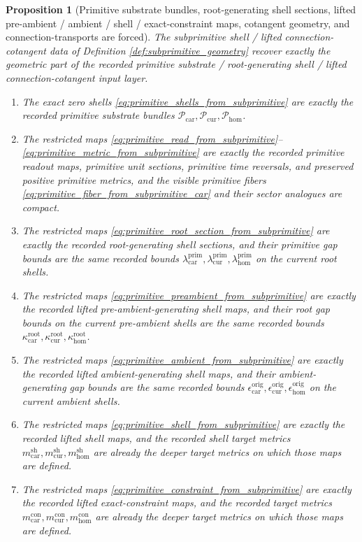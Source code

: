 \documentclass[11pt]{article}
\newcommand{\TensorShellMetric}{m_{\mathrm{car}}^{\mathrm{sh}}}
\newcommand{\CurShellMetric}{m_{\mathrm{cur}}^{\mathrm{sh}}}
\newcommand{\HomShellMetric}{m_{\mathrm{hom}}^{\mathrm{sh}}}
\newcommand{\TensorConstraintMetric}{m_{\mathrm{car}}^{\mathrm{con}}}
\newcommand{\CurConstraintMetric}{m_{\mathrm{cur}}^{\mathrm{con}}}
\newcommand{\HomConstraintMetric}{m_{\mathrm{hom}}^{\mathrm{con}}}
\newcommand{\TensorOriginGap}{\epsilon_{\mathrm{car}}^{\mathrm{orig}}}
\newcommand{\CurOriginGap}{\epsilon_{\mathrm{cur}}^{\mathrm{orig}}}
\newcommand{\HomOriginGap}{\epsilon_{\mathrm{hom}}^{\mathrm{orig}}}
\newcommand{\TensorRootGap}{\kappa_{\mathrm{car}}^{\mathrm{root}}}
\newcommand{\CurRootGap}{\kappa_{\mathrm{cur}}^{\mathrm{root}}}
\newcommand{\HomRootGap}{\kappa_{\mathrm{hom}}^{\mathrm{root}}}
\newcommand{\TensorPrimitiveSpace}{\mathcal P_{\mathrm{car}}}
\newcommand{\CurPrimitiveSpace}{\mathcal P_{\mathrm{cur}}}
\newcommand{\HomPrimitiveSpace}{\mathcal P_{\mathrm{hom}}}
\newcommand{\TensorPrimitiveGap}{\lambda_{\mathrm{car}}^{\mathrm{prim}}}
\newcommand{\CurPrimitiveGap}{\lambda_{\mathrm{cur}}^{\mathrm{prim}}}
\newcommand{\HomPrimitiveGap}{\lambda_{\mathrm{hom}}^{\mathrm{prim}}}
\newtheorem{proposition}{Proposition}
\begin{document}
\begin{proposition}[Primitive substrate bundles, root-generating shell sections, lifted pre-ambient / ambient / shell / exact-constraint maps, cotangent geometry, and connection-transports are forced]
\label{prop:primitive_geometry_forced}
The subprimitive shell / lifted connection-cotangent data of Definition \ref{def:subprimitive_geometry} recover exactly the geometric part of the recorded primitive substrate / root-generating shell / lifted connection-cotangent input layer.
\begin{enumerate}
    \item The exact zero shells \eqref{eq:primitive_shells_from_subprimitive} are exactly the recorded primitive substrate bundles \(\TensorPrimitiveSpace,\CurPrimitiveSpace,\HomPrimitiveSpace\).
    \item The restricted maps \eqref{eq:primitive_read_from_subprimitive}--\eqref{eq:primitive_metric_from_subprimitive} are exactly the recorded primitive readout maps, primitive unit sections, primitive time reversals, and preserved positive primitive metrics, and the visible primitive fibers \eqref{eq:primitive_fiber_from_subprimitive_car} and their sector analogues are compact.
    \item The restricted maps \eqref{eq:primitive_root_section_from_subprimitive} are exactly the recorded root-generating shell sections, and their primitive gap bounds are the same recorded bounds \(\TensorPrimitiveGap,\CurPrimitiveGap,\HomPrimitiveGap\) on the current root shells.
    \item The restricted maps \eqref{eq:primitive_preambient_from_subprimitive} are exactly the recorded lifted pre-ambient-generating shell maps, and their root gap bounds on the current pre-ambient shells are the same recorded bounds \(\TensorRootGap,\CurRootGap,\HomRootGap\).
    \item The restricted maps \eqref{eq:primitive_ambient_from_subprimitive} are exactly the recorded lifted ambient-generating shell maps, and their ambient-generating gap bounds are the same recorded bounds \(\TensorOriginGap,\CurOriginGap,\HomOriginGap\) on the current ambient shells.
    \item The restricted maps \eqref{eq:primitive_shell_from_subprimitive} are exactly the recorded lifted shell maps, and the recorded shell target metrics \(\TensorShellMetric,\CurShellMetric,\HomShellMetric\) are already the deeper target metrics on which those maps are defined.
    \item The restricted maps \eqref{eq:primitive_constraint_from_subprimitive} are exactly the recorded lifted exact-constraint maps, and the recorded target metrics \(\TensorConstraintMetric,\CurConstraintMetric,\HomConstraintMetric\) are already the deeper target metrics on which those maps are defined.

\end{enumerate}
\end{proposition}
\end{document}
